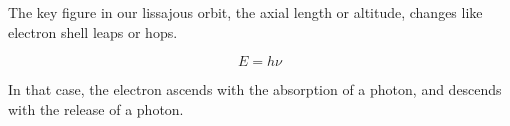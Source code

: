 

The key figure in our lissajous orbit, the axial length or altitude,
changes like electron shell leaps or hops.

$$
 E = h\nu
$$

In that case, the electron ascends with the absorption of a photon,
and descends with the release of a photon.

\bye


